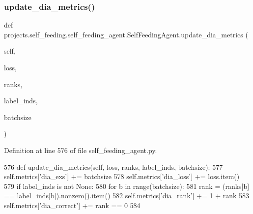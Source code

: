 \subsubsection{\texorpdfstring{update\+\_\+dia\+\_\+metrics()}{update\_dia\_metrics()}}
{\footnotesize\ttfamily def projects.\+self\+\_\+feeding.\+self\+\_\+feeding\+\_\+agent.\+Self\+Feeding\+Agent.\+update\+\_\+dia\+\_\+metrics (\begin{DoxyParamCaption}\item[{}]{self,  }\item[{}]{loss,  }\item[{}]{ranks,  }\item[{}]{label\+\_\+inds,  }\item[{}]{batchsize }\end{DoxyParamCaption})}



Definition at line 576 of file self\+\_\+feeding\+\_\+agent.\+py.


\begin{DoxyCode}
576     \textcolor{keyword}{def }update\_dia\_metrics(self, loss, ranks, label\_inds, batchsize):
577         self.metrics[\textcolor{stringliteral}{'dia\_exs'}] += batchsize
578         self.metrics[\textcolor{stringliteral}{'dia\_loss'}] += loss.item()
579         \textcolor{keywordflow}{if} label\_inds \textcolor{keywordflow}{is} \textcolor{keywordflow}{not} \textcolor{keywordtype}{None}:
580             \textcolor{keywordflow}{for} b \textcolor{keywordflow}{in} range(batchsize):
581                 rank = (ranks[b] == label\_inds[b]).nonzero().item()
582                 self.metrics[\textcolor{stringliteral}{'dia\_rank'}] += 1 + rank
583                 self.metrics[\textcolor{stringliteral}{'dia\_correct'}] += rank == 0
584 
\end{DoxyCode}
\mbox{\label{classprojects_1_1self__feeding_1_1self__feeding__agent_1_1SelfFeedingAgent_a39ce3bfde7b4bcf692133012a7a3bcbc}} 
